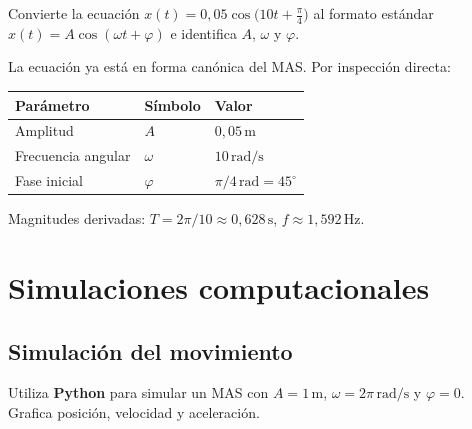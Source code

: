 \documentclass[12pt, a4paper, oneside]{book}
\newcommand{\rad}{\,\text{rad/s}}
\newcommand{\Hz}{\,\text{Hz}}
\newcommand{\mts}{\,\text{m}}
\begin{document}
\begin{problema}[title={Problema~5}]
Convierte la ecuaci\'on $x(t) = 0{,}05\cos\!\bigl(10t + \tfrac{\pi}{4}\bigr)$
al formato est\'andar $x(t) = A\cos(\omega t + \varphi)$ e identifica $A$,
$\omega$ y $\varphi$.
\end{problema}

\begin{solucion}
La ecuaci\'on ya est\'a en forma can\'onica del MAS. Por inspecci\'on directa:

\medskip
\begin{center}
\renewcommand{\arraystretch}{1.5}
\begin{tabular}{lll}
\toprule
Par\'ametro & S\'imbolo & Valor \\
\midrule
Amplitud            & $A$       & $0{,}05\,\text{m}$            \\
Frecuencia angular  & $\omega$  & $10\,\text{rad/s}$            \\
Fase inicial        & $\varphi$ & $\pi/4\,\text{rad} = 45^\circ$ \\
\bottomrule
\end{tabular}
\end{center}

\medskip
Magnitudes derivadas: $T = 2\pi/10 \approx 0{,}628\,\text{s}$,
$f \approx 1{,}592\Hz$.
\end{solucion}

\chapter{Simulaciones computacionales}

\section{Simulaci\'on del movimiento}

\begin{problema}[title={Problema~6}]
Utiliza \textbf{Python} para simular un MAS con $A = 1\mts$,
$\omega = 2\pi\rad$ y $\varphi = 0$. Grafica posici\'on, velocidad y aceleraci\'on.
\end{problema}
\end{document}

